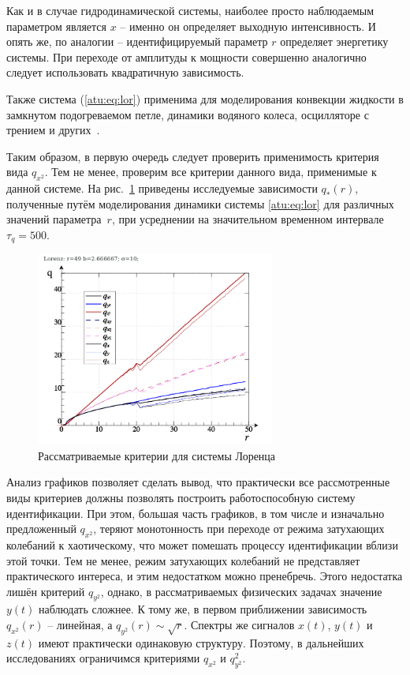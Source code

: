 Как и в случае гидродинамической системы, наиболее просто наблюдаемым
параметром является $x$ -- именно он определяет выходную интенсивность. И
опять же, по аналогии -- идентифицируемый параметр $r$ определяет энергетику
системы. При переходе от амплитуды к мощности совершенно аналогично
следует использовать квадратичную зависимость.

Также система (\ref{atu:eq:lor}) применима для
моделирования конвекции жидкости в замкнутом подогреваемом петле,
динамики водяного колеса, осцилляторе с трением и других~\cite{kuznetsov_dyn_chaos}.

Таким образом, в первую очередь следует проверить применимость
критерия вида $q_{x^2}$. Тем не менее, проверим все
критерии данного вида, применимые к данной системе.
На рис.~\ref{atu:f:lor_q} приведены исследуемые зависимости
$q_{*}(r)$, полученные путём моделирования динамики
системы \ref{atu:eq:lor} для различных значений параметра~$r$,
при усреднении на значительном временном интервале $\tau_q=500$.


\begin{figure}[h!]
  \centerline{\includegraphics[width=0.7\textwidth]{p/cha/lor/lor_q-p_q_r.png} }
  \caption{Рассматриваемые критерии для системы Лоренца}
  \label{atu:f:lor_q}
\end{figure}

Анализ графиков позволяет сделать вывод, что практически все
рассмотренные виды критериев должны позволять построить
работоспособную систему идентификации. При этом,
большая часть графиков, в том числе и изначально
предложенный $q_{x^2}$, теряют монотонность
при переходе от режима затухающих колебаний к хаотическому,
что может помешать процессу идентификации вблизи этой точки.
Тем не менее, режим затухающих колебаний не представляет
практического интереса, и этим недостатком можно пренебречь.
Этого недостатка лишён критерий $q_{y^2}$, однако,
в рассматриваемых физических задачах значение
$y(t)$ наблюдать сложнее. К тому же, в первом приближении
зависимость $q_{x^2}(r)$ -- линейная, а
$q_{y^2}(r) \sim \sqrt{r}$.
Спектры же сигналов $x(t)$, $y(t)$ и $z(t)$
имеют практически одинаковую структуру.
Поэтому, в дальнейших исследованиях ограничимся
критериями
$q_{x^2}$ и
$q_{y^2}^2$.

